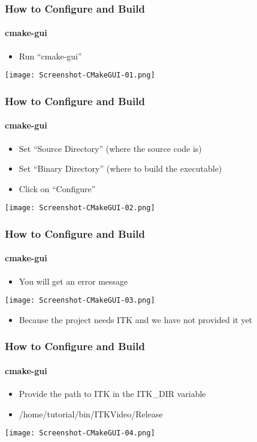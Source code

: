 \begin{frame}[fragile]
\frametitle{How to Configure and Build}
\framesubtitle{cmake-gui}
\begin{itemize}
\item Run ``cmake-gui''
\end{itemize}
\begin{center}
  \texttt{[image: Screenshot-CMakeGUI-01.png]}
\end{center}
\end{frame}

\begin{frame}[fragile]
\frametitle{How to Configure and Build}
\framesubtitle{cmake-gui}
\begin{itemize}
\item Set ``Source Directory'' (where the source code is)
\item Set ``Binary Directory'' (where to build the executable)
\item Click on ``Configure''
\end{itemize}
\begin{center}
  \texttt{[image: Screenshot-CMakeGUI-02.png]}
\end{center}
\end{frame}

\begin{frame}[fragile]
\frametitle{How to Configure and Build}
\framesubtitle{cmake-gui}
\begin{itemize}
\item You will get an error message
\end{itemize}
\begin{center}
  \texttt{[image: Screenshot-CMakeGUI-03.png]}
\end{center}
\begin{itemize}
\item Because the project needs ITK and we have not provided it yet
\end{itemize}
\end{frame}


\begin{frame}[fragile]
\frametitle{How to Configure and Build}
\framesubtitle{cmake-gui}
\begin{itemize}
\item Provide the path to ITK in the ITK\_DIR variable
\item /home/tutorial/bin/ITKVideo/Release
\end{itemize}
\begin{center}
  \texttt{[image: Screenshot-CMakeGUI-04.png]}
\end{center}
\end{frame}

